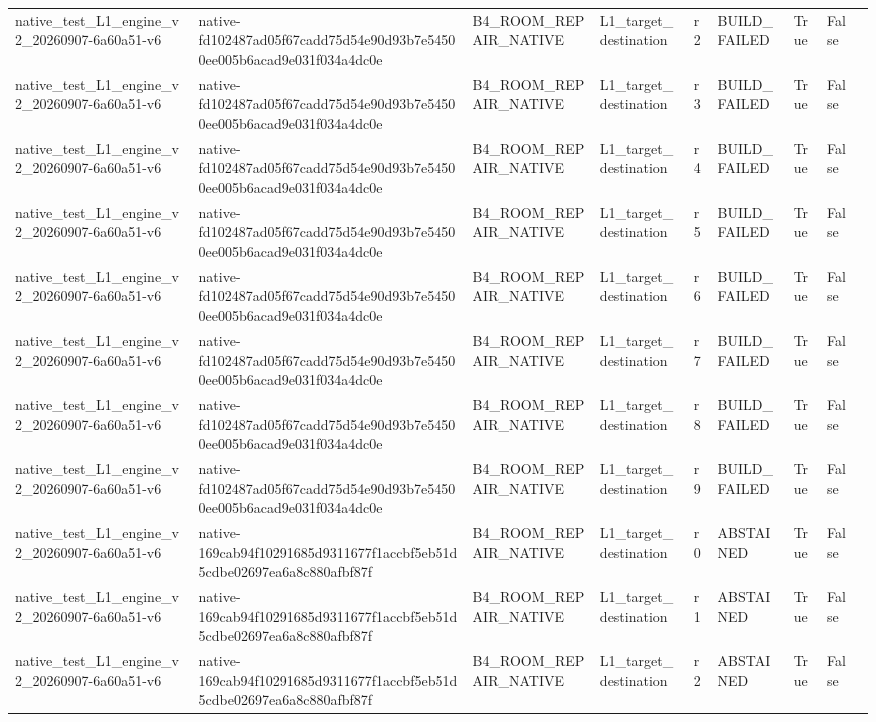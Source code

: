 \begin{tabular}{lllllllll}
native\_test\_L1\_engine\_v2\_20260907-6a60a51-v6 & native-fd102487ad05f67cadd75d54e90d93b7e54500ee005b6acad9e031f034a4dc0e & B4\_ROOM\_REPAIR\_NATIVE & L1\_target\_destination & r2 & BUILD\_FAILED & True & False &  \\
native\_test\_L1\_engine\_v2\_20260907-6a60a51-v6 & native-fd102487ad05f67cadd75d54e90d93b7e54500ee005b6acad9e031f034a4dc0e & B4\_ROOM\_REPAIR\_NATIVE & L1\_target\_destination & r3 & BUILD\_FAILED & True & False &  \\
native\_test\_L1\_engine\_v2\_20260907-6a60a51-v6 & native-fd102487ad05f67cadd75d54e90d93b7e54500ee005b6acad9e031f034a4dc0e & B4\_ROOM\_REPAIR\_NATIVE & L1\_target\_destination & r4 & BUILD\_FAILED & True & False &  \\
native\_test\_L1\_engine\_v2\_20260907-6a60a51-v6 & native-fd102487ad05f67cadd75d54e90d93b7e54500ee005b6acad9e031f034a4dc0e & B4\_ROOM\_REPAIR\_NATIVE & L1\_target\_destination & r5 & BUILD\_FAILED & True & False &  \\
native\_test\_L1\_engine\_v2\_20260907-6a60a51-v6 & native-fd102487ad05f67cadd75d54e90d93b7e54500ee005b6acad9e031f034a4dc0e & B4\_ROOM\_REPAIR\_NATIVE & L1\_target\_destination & r6 & BUILD\_FAILED & True & False &  \\
native\_test\_L1\_engine\_v2\_20260907-6a60a51-v6 & native-fd102487ad05f67cadd75d54e90d93b7e54500ee005b6acad9e031f034a4dc0e & B4\_ROOM\_REPAIR\_NATIVE & L1\_target\_destination & r7 & BUILD\_FAILED & True & False &  \\
native\_test\_L1\_engine\_v2\_20260907-6a60a51-v6 & native-fd102487ad05f67cadd75d54e90d93b7e54500ee005b6acad9e031f034a4dc0e & B4\_ROOM\_REPAIR\_NATIVE & L1\_target\_destination & r8 & BUILD\_FAILED & True & False &  \\
native\_test\_L1\_engine\_v2\_20260907-6a60a51-v6 & native-fd102487ad05f67cadd75d54e90d93b7e54500ee005b6acad9e031f034a4dc0e & B4\_ROOM\_REPAIR\_NATIVE & L1\_target\_destination & r9 & BUILD\_FAILED & True & False &  \\
native\_test\_L1\_engine\_v2\_20260907-6a60a51-v6 & native-169cab94f10291685d9311677f1accbf5eb51d5cdbe02697ea6a8c880afbf87f & B4\_ROOM\_REPAIR\_NATIVE & L1\_target\_destination & r0 & ABSTAINED & True & False &  \\
native\_test\_L1\_engine\_v2\_20260907-6a60a51-v6 & native-169cab94f10291685d9311677f1accbf5eb51d5cdbe02697ea6a8c880afbf87f & B4\_ROOM\_REPAIR\_NATIVE & L1\_target\_destination & r1 & ABSTAINED & True & False &  \\
native\_test\_L1\_engine\_v2\_20260907-6a60a51-v6 & native-169cab94f10291685d9311677f1accbf5eb51d5cdbe02697ea6a8c880afbf87f & B4\_ROOM\_REPAIR\_NATIVE & L1\_target\_destination & r2 & ABSTAINED & True & False &  \\

\end{tabular}
